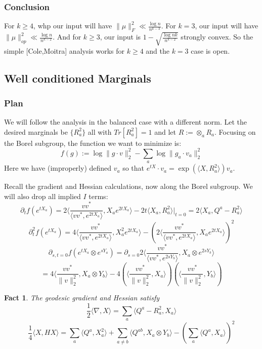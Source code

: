 \documentclass{article}
\newtheorem{fact}[theorem]{Fact}
\begin{document}
\subsubsection{Conclusion}
For $k \geq 4$, whp our input will have $\|\mu\|_{F}^{2} \ll \frac{\log n}{n^{k-3}}$. For $k=3$, our input will have $\|\mu\|_{op}^{2} \ll \frac{\log n}{n^{k-2}}$. And for $k \geq 3$, our input is $1 - \sqrt{\frac{\log nk}{n^{k-2}}}$ strongly convex. So the simple [Cole,Moitra] analysis works for $k \geq 4$ and the $k=3$ case is open.  

\subsection{Well conditioned Marginals}

\subsubsection{Plan}
We will follow the analysis in the balanced case with a different norm. Let the desired marginals be $\{R_{a}^{2}\}$ all with $Tr[R_{a}^{2}] = 1$ and let $R := \otimes_{a} R_{a}$. Focusing on the Borel subgroup, the function we want to minimize is:
\[ f(g) := \log \|g \cdot v\|_{2}^{2} - \sum_{a} \log \|g_{a} \cdot v_{a}\|_{2}^{2}  \]
Here we have (improperly) defined $v_{a}$ so that $e^{tX} \cdot v_{a} = \exp(\langle X, R_{a}^{2} \rangle) v_{a}$. 

Recall the gradient and Hessian calculations, now along the Borel subgroup. We will also drop all implied $I$ terms:
\[ \partial_{t} f(e^{t X_{a}}) = 2 \langle \frac{v v^{*}}{\langle v v^{*}, e^{2tX_{a}} \rangle}, X_{a} e^{2tX_{a}} \rangle - 2t\langle X_{a}, R_{a}^{2} \rangle |_{t=0}  = 2\langle X_{a}, Q^{a} - R_{a}^{2} \rangle \]
\[ \partial_{t}^{2} f(e^{t X_{a}}) = 4 \langle \frac{v v^{*}}{\langle v v^{*}, e^{2tX_{a}} \rangle}, X_{a}^{2} e^{2tX_{a}} \rangle -  \left( 2 \langle \frac{v v^{*}}{\langle v v^{*}, e^{2tX_{a}} \rangle}, X_{a} e^{2tX_{a}} \rangle  \right)^{2}    \]
\[ \partial_{s,t=0} f(e^{tX_{a}} \otimes e^{sY_{a}}) = \partial_{s=0} 2 \langle \frac{v v^{*}}{\langle v v^{*}, e^{2sY_{b}} \rangle}, X_{a} \otimes e^{2sY_{b}} \rangle \]
\[ = 4 \langle \frac{v v^{*}}{\|v\|_{2}^{2}}, X_{a} \otimes Y_{b} \rangle - 4 \left( \langle \frac{v v^{*}}{\|v\|_{2}^{2}}, X_{a} \rangle  \right) \left( \langle \frac{v v^{*}}{\|v\|_{2}^{2}}, Y_{b} \rangle  \right)   \]

\begin{fact}
The geodesic gradient and Hessian satisfy
\[ \frac{1}{2} \langle \nabla, X \rangle = \sum_{a} \langle Q^{a} - R_{a}^{2}, X_{a} \rangle \]
\[ \frac{1}{4} \langle X, H X \rangle = \sum_{a} \langle Q^{a}, X_{a}^{2} \rangle  + \sum_{a \neq b} \langle Q^{ab}, X_{a} \otimes Y_{b} \rangle - \left( \sum_{a} \langle Q^{a}, X_{a} \rangle \right)^{2}  \]
\end{fact}
\end{document}
